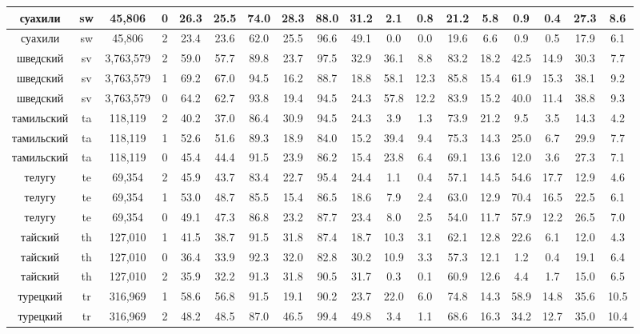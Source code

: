 \begin{table*}
{\begin{tabular}{|c|c|c|c||c|c|c|c|c|c|c|c|c|c|c|c|c|c|}
суахили & sw & 45,806 & 0 & 26.3 & 25.5 & 74.0 & 28.3 & 88.0 & 31.2 & 2.1 & 0.8 & 21.2 & 5.8 & 0.9 & 0.4 & 27.3 & 8.6\\ \hline
суахили & sw & 45,806 & 2 & 23.4 & 23.6 & 62.0 & 25.5 & 96.6 & 49.1 & 0.0 & 0.0 & 19.6 & 6.6 & 0.9 & 0.5 & 17.9 & 6.1\\ \hline
шведский & sv & 3,763,579 & 2 & 59.0 & 57.7 & 89.8 & 23.7 & 97.5 & 32.9 & 36.1 & 8.8 & 83.2 & 18.2 & 42.5 & 14.9 & 30.3 & 7.7\\ \hline
шведский & sv & 3,763,579 & 1 & 69.2 & 67.0 & 94.5 & 16.2 & 88.7 & 18.8 & 58.1 & 12.3 & 85.8 & 15.4 & 61.9 & 15.3 & 38.1 & 9.2\\ \hline
шведский & sv & 3,763,579 & 0 & 64.2 & 62.7 & 93.8 & 19.4 & 94.5 & 24.3 & 57.8 & 12.2 & 83.9 & 15.2 & 40.0 & 11.4 & 38.8 & 9.3\\ \hline
тамильский & ta & 118,119 & 2 & 40.2 & 37.0 & 86.4 & 30.9 & 94.5 & 24.3 & 3.9 & 1.3 & 73.9 & 21.2 & 9.5 & 3.5 & 14.3 & 4.2\\ \hline
тамильский & ta & 118,119 & 1 & 52.6 & 51.6 & 89.3 & 18.9 & 84.0 & 15.2 & 39.4 & 9.4 & 75.3 & 14.3 & 25.0 & 6.7 & 29.9 & 7.7\\ \hline
тамильский & ta & 118,119 & 0 & 45.4 & 44.4 & 91.5 & 23.9 & 86.2 & 15.4 & 23.8 & 6.4 & 69.1 & 13.6 & 12.0 & 3.6 & 27.3 & 7.1\\ \hline
телугу & te & 69,354 & 2 & 45.9 & 43.7 & 83.4 & 22.7 & 95.4 & 24.4 & 1.1 & 0.4 & 57.1 & 14.5 & 54.6 & 17.7 & 12.9 & 4.6\\ \hline
телугу & te & 69,354 & 1 & 53.0 & 48.7 & 85.5 & 15.4 & 86.5 & 18.6 & 7.9 & 2.4 & 63.0 & 12.9 & 70.4 & 16.5 & 22.5 & 6.1\\ \hline
телугу & te & 69,354 & 0 & 49.1 & 47.3 & 86.8 & 23.2 & 87.7 & 23.4 & 8.0 & 2.5 & 54.0 & 11.7 & 57.9 & 12.2 & 26.5 & 7.0\\ \hline
тайский & th & 127,010 & 1 & 41.5 & 38.7 & 91.5 & 31.8 & 87.4 & 18.7 & 10.3 & 3.1 & 62.1 & 12.8 & 22.6 & 6.1 & 12.0 & 4.3\\ \hline
тайский & th & 127,010 & 0 & 36.4 & 33.9 & 92.3 & 32.0 & 82.8 & 30.2 & 10.9 & 3.3 & 57.3 & 12.1 & 1.2 & 0.4 & 19.1 & 6.4\\ \hline
тайский & th & 127,010 & 2 & 35.9 & 32.2 & 91.3 & 31.8 & 90.5 & 31.7 & 0.3 & 0.1 & 60.9 & 12.6 & 4.4 & 1.7 & 15.0 & 6.5\\ \hline
турецкий & tr & 316,969 & 1 & 58.6 & 56.8 & 91.5 & 19.1 & 90.2 & 23.7 & 22.0 & 6.0 & 74.8 & 14.3 & 58.9 & 14.8 & 35.6 & 10.5\\ \hline
турецкий & tr & 316,969 & 2 & 48.2 & 48.5 & 87.0 & 46.5 & 99.4 & 49.8 & 3.4 & 1.1 & 68.6 & 16.3 & 34.2 & 12.7 & 35.0 & 10.4\\ \hline

\end{tabular}}
\end{table*}
